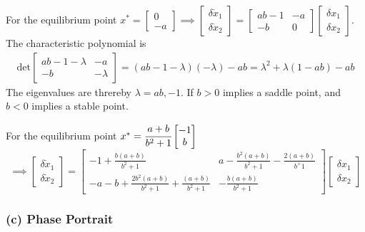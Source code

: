 For the equilibrium point \( x^* = \begin{bmatrix} 0 \\ -a \end{bmatrix} \implies
\begin{bmatrix} \delta \dot x_1 \\ \delta \dot x_2 \end{bmatrix}
=
\begin{bmatrix}
    ab-1 & -a \\
    -b   & 0
\end{bmatrix}
\begin{bmatrix} \delta x_1 \\ \delta x_2 \end{bmatrix}\).\\
The characteristic polynomial is
\begin{align*}
    \text{det}
    \begin{bmatrix}
        ab - 1 - \lambda & -a       \\
        -b               & -\lambda
    \end{bmatrix}
    =
    (ab - 1 - \lambda)(-\lambda) - a b
    =
    \lambda^2 + \lambda (1 - ab) - ab
\end{align*}
The eigenvalues are threreby \( \lambda = ab, -1 \).
If \( b > 0 \) implies a saddle point, and \( b < 0 \) implies a stable point.

For the equilibrium point \( x^* = \cfrac{a+b}{b^2 + 1} \begin{bmatrix} -1 \\ b \end{bmatrix} \)
\[ \implies
    \begin{bmatrix} \delta \dot x_1 \\ \delta \dot x_2 \end{bmatrix}
    =
    \begin{bmatrix}
        -1 + \frac{b(a+b)}{b^2+1}                              & a - \frac{b^2(a+b)}{b^2+1}-\frac{2(a+b)}{b^+1} \\
        -a - b + \frac{2b^2(a+b)}{b^2+1} + \frac{(a+b)}{b^2+1} & -\frac{b(a+b)}{b^2+1}
    \end{bmatrix}
    \begin{bmatrix} \delta x_1 \\ \delta x_2 \end{bmatrix}
\]

\subsubsection*{(c) Phase Portrait}

